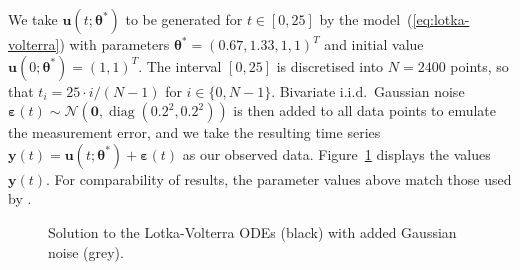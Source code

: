 \documentclass[11pt,a4paper]{report}
\DeclareMathOperator{\diag}{diag}
\begin{document}
We take $\mathbf{u}(t;\pmb{\theta}^*)$ to be generated for $t \in [0, 25]$ by the model~(\ref{eq:lotka-volterra}) with parameters $\pmb{\theta}^* = (0.67, 1.33, 1, 1)^T$ and initial value $\mathbf{u}(0; \pmb{\theta}^*) = (1, 1)^T$. The interval $[0, 25]$ is discretised into $N = 2400$ points, so that $t_i = 25 \cdot i / (N - 1)$ for $i \in \{0, N - 1\}$. Bivariate i.i.d.\ Gaussian noise $\pmb{\varepsilon}(t) \sim \mathcal{N}\left( \mathbf{0}, \diag(0.2^2, 0.2^2) \right)$ is then added to all data points to emulate the measurement error, and we take the resulting time series $\mathbf{y}(t) = \mathbf{u}(t;\pmb{\theta}^*) + \pmb{\varepsilon}(t)$ as our observed data. Figure~\ref{fig:lotka-volterra:data} displays the values $\mathbf{y}(t)$. For comparability of results, the parameter values above match those used by \cite{riabizOptimalThinningMCMC2022}. 

\begin{figure}[h]
\centering
{}
\caption{Solution to the Lotka-Volterra ODEs (black) with added Gaussian noise (grey).
\label{fig:lotka-volterra:data}}
\end{figure}
\end{document}
